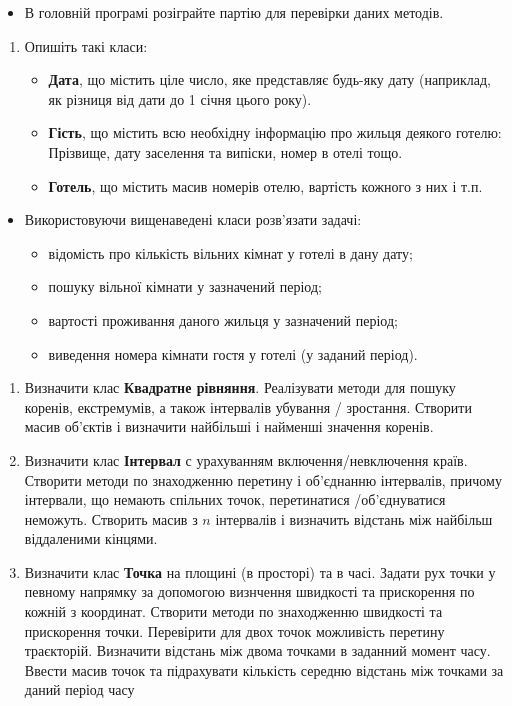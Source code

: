 \documentclass[]{article}
\begin{document}
\begin{itemize}
\item
  В головній програмі розіграйте партію для перевірки даних методів.
\end{itemize}

\begin{enumerate}
\def\labelenumi{\arabic{enumi}.}
\item
  Опишіть такі класи:

  \begin{itemize}
  \item
    \textbf{Дата}, що містить ціле число, яке представляє будь-яку дату
    (наприклад, як різниця від дати до 1 січня цього року).
  \item
    \textbf{Гість}, що містить всю необхідну інформацію про жильця
    деякого готелю: Прізвище, дату заселення та випіски, номер в отелі
    тощо.
  \item
    \textbf{Готель}, що містить масив номерів отелю, вартість кожного з
    них і т.п.
  \end{itemize}
\end{enumerate}

\begin{itemize}
\item
  Використовуючи вищенаведені класи розв'язати задачі:

  \begin{itemize}
  \item
    відомість про кількість вільних кімнат у готелі в дану дату;
  \item
    пошуку вільної кімнати у зазначений період;
  \item
    вартості проживання даного жильця у зазначений період;
  \item
    виведення номера кімнати гостя у готелі (у заданий період).
  \end{itemize}
\end{itemize}

\begin{enumerate}
\def\labelenumi{\arabic{enumi}.}
\item
  Визначити клас \textbf{Квадратне рівняння}. Реалізувати методи для
  пошуку коренів, екстремумів, а також інтервалів убування / зростання.
  Створити масив об'єктів і визначити найбільші і найменші значення
  коренів.
\item
  Визначити клас \textbf{Інтервал} с урахуванням включення/невключення
  країв. Створити методи по знаходженню перетину і об'єднанню
  інтервалів, причому інтервали, що немають спільних точок, перетинатися
  /об'єднуватися неможуть. Створить масив з \(n\) інтервалів і визначить
  відстань між найбільш віддаленими кінцями.
\item
  Визначити клас \textbf{Точка} на площині (в просторі) та в часі.
  Задати рух точки у певному напрямку за допомогою визнчення швидкості
  та прискорення по кожній з координат. Створити методи по знаходженню
  швидкості та прискорення точки. Перевірити для двох точок можливість
  перетину траєкторій. Визначити відстань між двома точками в заданний
  момент часу. Ввести масив точок та підрахувати кількість середню
  відстань між точками за даний період часу
\end{enumerate}
\end{document}
